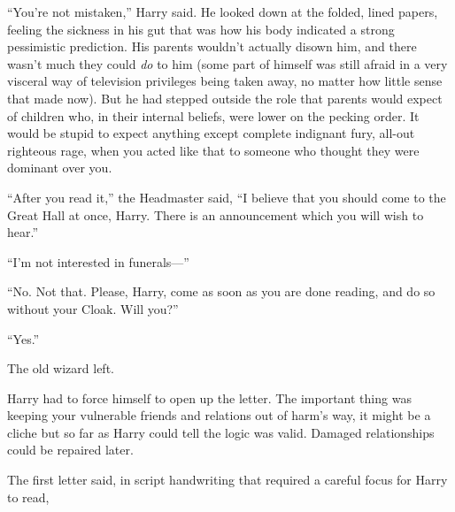 “You’re not mistaken,” Harry said. He looked down at the folded, lined papers, feeling the sickness in his gut that was how his body indicated a strong pessimistic prediction. His parents wouldn’t actually disown him, and there wasn’t much they could \emph{do} to him (some part of himself was still afraid in a very visceral way of television privileges being taken away, no matter how little sense that made now). But he had stepped outside the role that parents would expect of children who, in their internal beliefs, were lower on the pecking order. It would be stupid to expect anything except complete indignant fury, all-out righteous rage, when you acted like that to someone who thought they were dominant over you.

“After you read it,” the Headmaster said, “I believe that you should come to the Great Hall at once, Harry. There is an announcement which you will wish to hear.”

“I’m not interested in funerals—”

“No. Not that. Please, Harry, come as soon as you are done reading, and do so without your Cloak. Will you?”

“Yes.”

The old wizard left.

Harry had to force himself to open up the letter. The important thing was keeping your vulnerable friends and relations out of harm’s way, it might be a cliche but so far as Harry could tell the logic was valid. Damaged relationships could be repaired later.

The first letter said, in script handwriting that required a careful focus for Harry to read,

